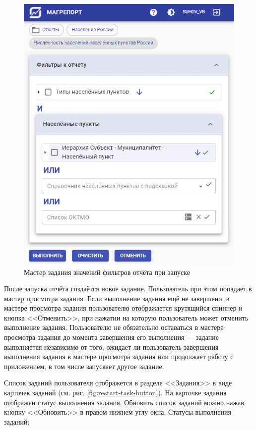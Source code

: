 \documentclass[../user-manual.tex]{subfiles}
\begin{document}
	\begin{figure}[h]
		\centering
		\includegraphics[width=\graphicswidth]{img/4-set-report-filters.png}
		\caption{Мастер задания значений фильтров отчёта при запуске}
		\label{fig:set-report-filters}
	\end{figure}

	После запуска отчёта создаётся новое задание. Пользователь при этом попадает в мастер просмотра задания. Если выполнение задания ещё не завершено, в мастере просмотра задания пользователю отображается крутящийся спиннер и кнопка <<Отменить>>, при нажатии на которую пользователь может отменить выполнение задания. Пользователю не обязательно оставаться в мастере просмотра задания до момента завершения его выполнения --- задание выполняется независимо от того, ожидает ли пользователь завершения выполнения задания в мастере просмотра задания или продолжает работу с приложением, в том числе запускает другое задание.
	
	Список заданий пользователя отображется в разделе <<Задания>> в виде карточек заданий (см. рис. \ref{fig:restart-task-button}). На карточке задания отображен статус выполнения задания. Обновить список заданий можно нажав кнопку <<Обновить>> в правом нижнем углу окна. Статусы выполнения заданий:
	
\end{document}

